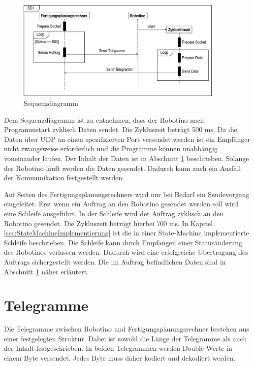 \begin{figure}[htb]
    \centering
    \includegraphics[width=0.9\textwidth]{Abbildungen/Sequenzdiagramm.PNG}
    \caption{Sequenzdiagramm}		
    \label{fig:Sequenzdiagramm}
\end{figure}

Dem Sequenzdiagramm ist zu entnehmen, dass der Robotino nach Programmstart zyklisch Daten sendet. Die Zykluszeit beträgt 500 ms. Da die Daten über UDP an einen spezifizierten Port versendet werden ist ein Empfänger nicht zwangsweise erforderlich und die Programme können unabhängig voneinander laufen. Der Inhalt der Daten ist in Abschnitt \ref{sec:Telegramme} beschrieben. Solange der Robotino läuft werden die Daten gesendet. Dadurch kann auch ein Ausfall der Kommunikation festgestellt werden. 

Auf Seiten des Fertigungsplanungsrechners wird nur bei Bedarf ein Sendevorgang eingeleitet. Erst wenn ein Auftrag an den Robotino gesendet werden soll wird eine Schleife ausgeführt. In der Schleife wird der Auftrag zyklisch an den Robotino gesendet. Die Zykluszeit beträgt hierbei 700 ms. In Kapitel \ref{sec:StateMachineImplementierung} ist die in einer State-Machine implementierte Schleife beschrieben. Die Schleife kann durch Empfangen einer Statusänderung des Robotinos verlassen werden. Dadurch wird eine erfolgreiche Übertragung des Auftrags sichergestellt werden. Die im Auftrag befindlichen Daten sind in Abschnitt \ref{sec:Telegramme} näher erläutert.

\section{Telegramme}
\label{sec:Telegramme}

Die Telegramme zwischen Robotino und Fertigungsplanungsrechner bestehen aus einer festgelegten Struktur. Dabei ist sowohl die Länge der Telegramme als auch der Inhalt festgeschrieben. In beiden Telegrammen werden Double-Werte in einem Byte versendet. Jedes Byte muss daher kodiert und dekodiert werden. 

